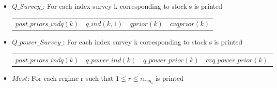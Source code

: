 \documentclass{article}
\begin{document}
\begin{itemize}
\begin{center}
\begin{tabular}{c c}
\end{tabular}
\end{center}

\item $Q\_Survey\_$: For each index survey k corresponding to stock s is printed 
\begin{center}
    \begin{tabular}{c c c c}
        $post\_priors\_indq(k)$ & $q\_ind(k,1)$ & $qprior(k)$ & $cvqprior(k)$ \\
    \end{tabular}
\end{center}


\item $Q\_power\_Survey\_$: For each index survey k corresponding to stock s is printed 
\begin{center}
    \begin{tabular}{c c c c}
        $post\_priors\_indq(k)$ & $q\_power\_ind(k)$ & $q\_power\_prior(k)$ & $cvq\_power\_prior(k)$. \\
    \end{tabular}
\end{center}

\item $Mest$: For each regime r such that $1\leq r\leq n_{reg_s}$ is printed
\end{itemize}
\end{document}
